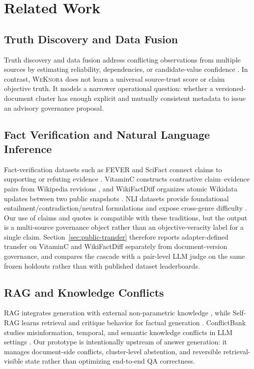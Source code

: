 \documentclass[conference]{IEEEtran}
\newcommand{\sys}{\textsc{WeKnora}}
\begin{document}
\section{Related Work}
\label{sec:related}

\subsection{Truth Discovery and Data Fusion}

Truth discovery and data fusion address conflicting observations from multiple sources by estimating reliability, dependencies, or candidate-value confidence \cite{yin2008truth,li2016truthsurvey,dong2013datafusion,dong2014knowledgevault}. In contrast, \sys{} does not learn a universal source-trust score or claim objective truth. It models a narrower operational question: whether a versioned-document cluster has enough explicit and mutually consistent metadata to issue an advisory governance proposal.

\subsection{Fact Verification and Natural Language Inference}

Fact-verification datasets such as FEVER and SciFact connect claims to supporting or refuting evidence \cite{thorne2018fever,wadden2020scifact}. VitaminC constructs contrastive claim--evidence pairs from Wikipedia revisions \cite{schuster2021vitaminc}, and WikiFactDiff organizes atomic Wikidata updates between two public snapshots \cite{ammarkhodja2024wikifactdiff}. NLI datasets provide foundational entailment/contradiction/neutral formulations and expose cross-genre difficulty \cite{bowman2015snli,williams2018multinli}. Our use of claims and quotes is compatible with these traditions, but the output is a multi-source governance object rather than an objective-veracity label for a single claim. Section~\ref{sec:public-transfer} therefore reports adapter-defined transfer on VitaminC and WikiFactDiff separately from document-version governance, and compares the cascade with a pair-level LLM judge on the same frozen holdouts rather than with published dataset leaderboards.

\subsection{RAG and Knowledge Conflicts}

RAG integrates generation with external non-parametric knowledge \cite{lewis2020rag}, while Self-RAG learns retrieval and critique behavior for factual generation \cite{asai2024selfrag}. ConflictBank studies misinformation, temporal, and semantic knowledge conflicts in LLM settings \cite{su2024conflictbank}. Our prototype is intentionally upstream of answer generation: it manages document-side conflicts, cluster-level abstention, and reversible retrieval-visible state rather than optimizing end-to-end QA correctness.
\end{document}
